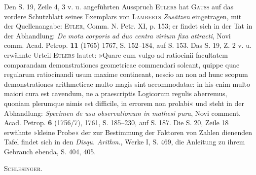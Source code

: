Den S. 19, Zeile 4, 3 v. u. angeführten Ausspruch \textsc{Eulers} hat \textsc{Gauss} auf das vordere Schutzblatt seines Exemplars von \textsc{Lamberts} \textit{Zusätzen} eingetragen, mit der Quellenangabe: \textsc{Euler}, Comm. N. Petr. XI, p. 153; er findet sich in der Tat in der Abhandlung: \textit{De motu corporis ad duo centra virium fixa attracti}, Novi comm. Acad. Petrop. \textbf{11} (1765) 1767, S. 152--184, auf S. 153. Das S. 19, Z. 2 v. u. erwähnte Urteil \textsc{Eulers} lautet: »Quare cum vulgo ad ratiocinii facultatem comparandam demonstrationes geometricae commendari soleant, quippe quae regularum ratiocinandi usum maxime contineant, nescio an non ad hunc scopum demonstrationes arithmeticae multo magis sint accommodatae: in his enim multo maiori cura est cavendum, ne a praescriptis Logicorum regulis aberremus, quoniam plerumque nimis est difficile, in errorem non prolabi« und steht in der Abhandlung: \textit{Specimen de usu observationum in mathesi pura}, Novi comment. Acad. Petrop. \textbf{6} (1756/7), 1761, S. 185--230, auf S. 187. Die S. 20, Zeile 18 erwähnte »kleine Probe« der zur Bestimmung der Faktoren von Zahlen dienenden Tafel findet sich in den \textit{Disqu. Arithm.}, Werke I, S. 469, die Anleitung zu ihrem Gebrauch ebenda, S. 404, 405.
\begin{flushright}\textsc{Schlesinger}.\end{flushright}
\endgroup
\ClosingRule
\clearpage
